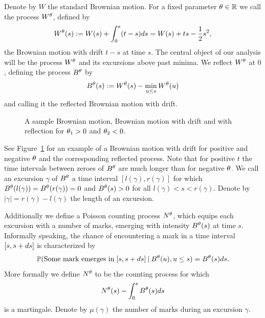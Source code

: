 Denote by $W$ the standard Brownian motion. 
For a fixed parameter $\theta \in \mathbb{R}$ we call the process $W^{\theta}$, defined by
\begin{equation}
	W^{\theta}(s) := W(s) + \int_{0}^{s}(t-s)ds = W(s) + ts - \frac{1}{2}s^2,
\end{equation}
the Brownian motion with drift $t-s$ at time $s$.
The central object of our analysis will be the process $W^{\theta}$ and its excursions above past minima.
We reflect $W^{\theta}$ at $0$, defining the process $B^{\theta}$ by
\begin{equation}
	B^{\theta}(s) := W^{\theta}(s) - \min_{u \leq s}W^{\theta}(u)
\end{equation}
and calling it the reflected Brownian motion with drift.

\begin{figure}%
	\centering
	\subfloat[$W(s)$]{}%
	\quad
	\subfloat[$W^{\pp_1}(s)$]{}%
	\quad
	\subfloat[$B^{\pp_1}(s)$]{}%
	\quad
	\subfloat[$W^{\pp_2}(s)$]{}%
	\quad
	\subfloat[$B^{\pp_2}(s)$]{}%
	\caption{A sample Brownian motion, Brownian motion with drift and with reflection for $\theta_1>0$ and $\theta_2<0$.}%
	\label{F: BM}%
\end{figure}

See Figure~\ref{F: BM} for an example of a Brownian motion with drift for positive and negative $\theta$ and the corresponding reflected process.
Note that for positive $t$ the time intervals between zeroes of $B^{\theta}$ are much longer than for negative $\theta$.
We call an excursion $\gamma$ of $B^{\theta}$ a time interval $[l(\gamma), r(\gamma)]$ for which $B^{\theta}(l(\gamma)) = B^{\theta}(r(\gamma)) = 0$
and $B^{\theta}(s) > 0$ for all $l(\gamma) < s < r(\gamma)$.
Denote by $|\gamma| = r(\gamma) - l(\gamma)$ the length of an excursion.

Additionally we define a Poisson counting process $N^{\theta}$, 
which equips each excursion with a number of marks,
emerging with intensity $B^{\theta}(s)$ at time $s$.
Informally speaking, the chance of encountering a mark in a time interval $[s, s+ds]$ is characterized by
\begin{equation}
	\mathbb{P}( \text{Some mark emerges in} \; [s, s+ds] \: | \: B^{\theta}(u), u \leq s ) = B^{\theta}(s)ds.
\end{equation}
More formally we define $N^{\theta}$ to be the counting process for which
\begin{equation}
	N^{\theta}(s) - \int_{0}^{s} B^{\theta}(s)ds
\end{equation}
is a martingale.
Denote by $\mu(\gamma)$ the number of marks during an excursion $\gamma$.

